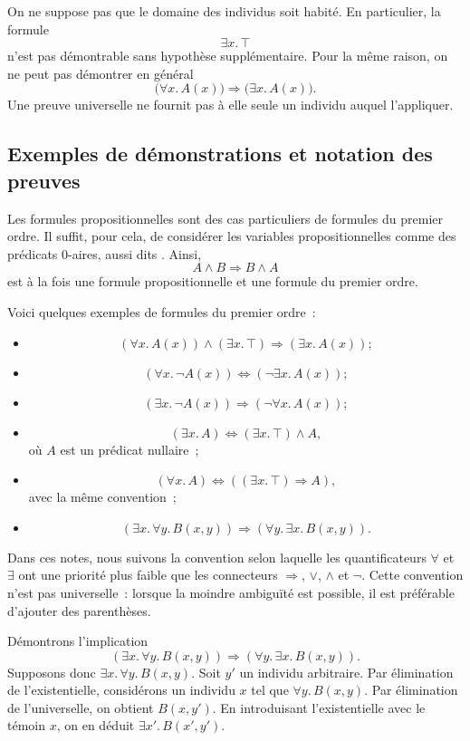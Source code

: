 \thingy
On ne suppose pas que le domaine des individus soit habité.  En
particulier, la formule
\[
\exists x.\,\top
\]
n'est pas démontrable sans hypothèse supplémentaire.  Pour la même
raison, on ne peut pas démontrer en général
\[
\bigl(\forall x.\,A(x)\bigr)\Rightarrow\bigl(\exists x.\,A(x)\bigr).
\]
Une preuve universelle ne fournit pas à elle seule un individu auquel
l'appliquer.

\subsection{Exemples de démonstrations et notation des preuves}

\thingy
Les formules propositionnelles sont des cas particuliers de formules du
premier ordre.  Il suffit, pour cela, de considérer les variables
propositionnelles comme des prédicats $0$-aires, aussi dits
.  Ainsi,
\[
A\land B\Rightarrow B\land A
\]
est à la fois une formule propositionnelle et une formule du premier
ordre.

\thingy
Voici quelques exemples de formules du premier ordre :
\begin{itemize}
\item
  \[
  (\forall x.\,A(x))\land(\exists x.\,\top)
  \Rightarrow(\exists x.\,A(x));
  \]
\item
  \[
  (\forall x.\,\neg A(x))\Leftrightarrow(\neg\exists x.\,A(x));
  \]
\item
  \[
  (\exists x.\,\neg A(x))\Rightarrow(\neg\forall x.\,A(x));
  \]
\item
  \[
  (\exists x.\,A)\Leftrightarrow(\exists x.\,\top)\land A,
  \]
  où $A$ est un prédicat nullaire ;
\item
  \[
  (\forall x.\,A)\Leftrightarrow((\exists x.\,\top)\Rightarrow A),
  \]
  avec la même convention ;
\item
  \[
  (\exists x.\,\forall y.\,B(x,y))
  \Rightarrow
  (\forall y.\,\exists x.\,B(x,y)).
  \]
\end{itemize}

\thingy
Dans ces notes, nous suivons la convention selon laquelle les
quantificateurs $\forall$ et $\exists$ ont une priorité plus faible que
les connecteurs $\Rightarrow$, $\lor$, $\land$ et $\neg$.  Cette
convention n'est pas universelle : lorsque la moindre ambiguïté est
possible, il est préférable d'ajouter des parenthèses.

\thingy
Démontrons l'implication
\[
(\exists x.\,\forall y.\,B(x,y))
\Rightarrow
(\forall y.\,\exists x.\,B(x,y)).
\]
Supposons donc $\exists x.\,\forall y.\,B(x,y)$.  Soit $y'$ un individu
arbitraire.  Par élimination de l'existentielle, considérons un
individu $x$ tel que $\forall y.\,B(x,y)$.  Par élimination de
l'universelle, on obtient $B(x,y')$.  En introduisant l'existentielle
avec le témoin $x$, on en déduit $\exists x'.\,B(x',y')$.

